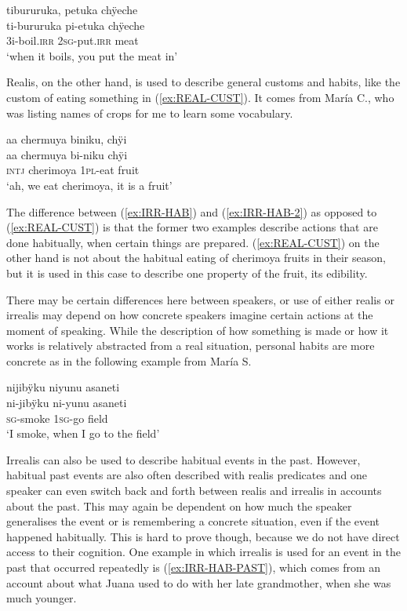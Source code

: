 \ea\label{ex:IRR-HAB-2}
\begingl 
\glpreamble tibururuka, petuka chÿeche\\
\gla ti-bururuka pi-etuka chÿeche\\ 
\glb 3i-boil.\textsc{irr} 2\textsc{sg}-put.\textsc{irr} meat\\ 
\glft ‘when it boils, you put the meat in’\\ 
\endgl
 \trailingcitation{[jmx-d110918ls-1.010]}
\xe
{}

Realis, on the other hand, is used to describe general customs and habits, like the custom of eating something in (\ref{ex:REAL-CUST}). It comes from María C., who was listing names of crops for me to learn some vocabulary.

\ea\label{ex:REAL-CUST}
\begingl 
\glpreamble aa chermuya biniku, chÿi\\
\gla aa chermuya bi-niku chÿi\\ 
\glb \textsc{intj} cherimoya 1\textsc{pl}-eat fruit\\ 
\glft ‘ah, we eat cherimoya, it is a fruit’\\ 
\endgl
 \trailingcitation{[uxx-p110825l.190]}
\xe
{}

The difference between (\ref{ex:IRR-HAB}) and (\ref{ex:IRR-HAB-2}) as opposed to (\ref{ex:REAL-CUST}) is that the former two examples describe actions that are done habitually, when certain things are prepared. (\ref{ex:REAL-CUST}) on the other hand is not about the habitual eating of cherimoya fruits in their season, but it is used in this case to describe one property of the fruit, its edibility.

There may be certain differences here between speakers, or use of either realis or irrealis may depend on how concrete speakers imagine certain actions at the moment of speaking. While the description of how something is made or how it works is relatively abstracted from a real situation, personal habits are more concrete as in the following example from María S.

\ea
\begingl 
\glpreamble nijibÿku niyunu asaneti\\
\gla ni-jibÿku ni-yunu asaneti\\ 
\textsc{sg}-smoke 1\textsc{sg}-go field\\ 
\glft ‘I smoke, when I go to the field’\\ 
\endgl
 \trailingcitation{[rxx-e120511l.390]}
\xe

Irrealis can also be used to describe habitual events in the past. However, habitual past events are also often described with realis predicates and one speaker can even switch back and forth between realis and irrealis in accounts about the past. This may again be dependent on how much the speaker generalises the event or is remembering a concrete situation, even if the event happened habitually. This is hard to prove though, because we do not have direct access to their cognition. One example in which irrealis is used for an event in the past that occurred repeatedly is (\ref{ex:IRR-HAB-PAST}), which comes from an account about what Juana used to do with her late grandmother, when she was much younger.

